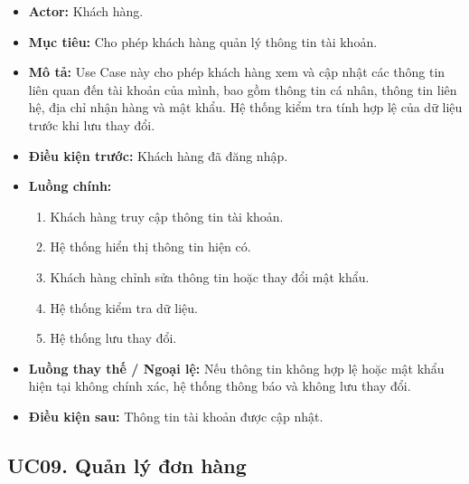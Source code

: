 \documentclass[12pt,a4paper]{article}
\begin{document}
\begin{itemize}

 \item \textbf{Actor:} Khách hàng.

 \item \textbf{Mục tiêu:} Cho phép khách hàng quản lý thông tin tài khoản.

 \item \textbf{Mô tả:} Use Case này cho phép khách hàng xem và cập nhật các thông tin liên quan đến tài khoản của mình, bao gồm thông tin cá nhân, thông tin liên hệ, địa chỉ nhận hàng và mật khẩu. Hệ thống kiểm tra tính hợp lệ của dữ liệu trước khi lưu thay đổi.

 \item \textbf{Điều kiện trước:} Khách hàng đã đăng nhập.

 \item \textbf{Luồng chính:}

 \begin{enumerate}

  \item Khách hàng truy cập thông tin tài khoản.

  \item Hệ thống hiển thị thông tin hiện có.

  \item Khách hàng chỉnh sửa thông tin hoặc thay đổi mật khẩu.

  \item Hệ thống kiểm tra dữ liệu.

  \item Hệ thống lưu thay đổi.

 \end{enumerate}

 \item \textbf{Luồng thay thế / Ngoại lệ:} Nếu thông tin không hợp lệ hoặc mật khẩu hiện tại không chính xác, hệ thống thông báo và không lưu thay đổi.

 \item \textbf{Điều kiện sau:} Thông tin tài khoản được cập nhật.

\end{itemize}


\subsection*{UC09. Quản lý đơn hàng}
\end{document}
